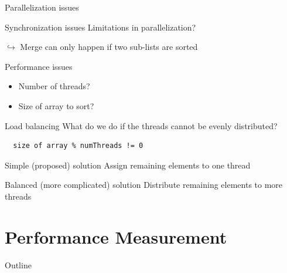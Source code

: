 \begin{frame}{Parallelization issues}
  \begin{block}{Synchronization issues}
    Limitations in parallelization?

    $\hookrightarrow$ Merge can only happen if two sub-lists are sorted
  \end{block}


  \begin{block}{Performance issues}
    \begin{itemize}
    \item Number of threads?
    \item Size of array to sort?
    \end{itemize}
  \end{block}
\end{frame}

\begin{frame}[fragile]{Load balancing}
  What do we do if the threads cannot be evenly distributed?
  
\begin{lstlisting}
  size of array % numThreads != 0
\end{lstlisting}


  \begin{exampleblock}{Simple (proposed) solution}
    Assign remaining elements to one thread
  \end{exampleblock}


  \begin{exampleblock}{Balanced (more complicated) solution}
    Distribute remaining elements to more threads
  \end{exampleblock}
\end{frame}


\section{Performance Measurement}

\begin{frame}{Outline}
  \tableofcontents[current]
\end{frame}

